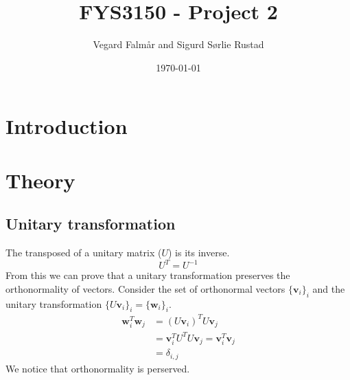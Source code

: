 \documentclass[reprint,english,notitlepage]{revtex4-1}  %
\begin{document}
\title{FYS3150 - Project 2}
\date{\today}
\author{Vegard Falmår and Sigurd Sørlie Rustad}

\newpage

\begin{abstract}

\end{abstract}
\maketitle


\section{Introduction}

\section{Theory}

\subsection{Unitary transformation}
The transposed of a unitary matrix ($U$) is its inverse.
\begin{equation*}
	U^T = U^{-1}
\end{equation*}
From this we can prove that a unitary transformation preserves the orthonormality of vectors. Consider the set of orthonormal vectors $\{ \mathbf{v}_i \}_i$ and the unitary transformation $\{ U\mathbf{v}_i \}_i = \{ \mathbf{w}_i \}_i$.
\begin{align*}
	\mathbf{w}_i^T\mathbf{w}_j &= (U\mathbf{v}_i)^TU\mathbf{v}_j \\
	&= \mathbf{v}_i^TU^TU\mathbf{v}_j = \mathbf{v}_i^T\mathbf{v}_j \\
	&= \delta_{i,j}
\end{align*}
We notice that orthonormality is perserved.
\end{document}
